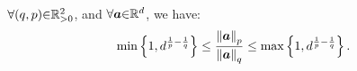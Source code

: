 \begin{property}
\label{prp:VectorDivisionBound}
$\forall (q , p) {\in} \mathbb{R}^2_{>0}$, and $\forall \boldsymbol{a} {\in} \mathbb{R}^d$, we have:
\begin{gather*}
\min \left\lbrace 1 , d^{\frac1p - \frac1q} \right\rbrace \leq \frac{\left\lVert\boldsymbol{a}\right\rVert_p}{\left\lVert\boldsymbol{a}\right\rVert_q} \leq \max \left\lbrace 1 , d^{\frac1p - \frac1q} \right\rbrace.
\end{gather*}
\end{property}